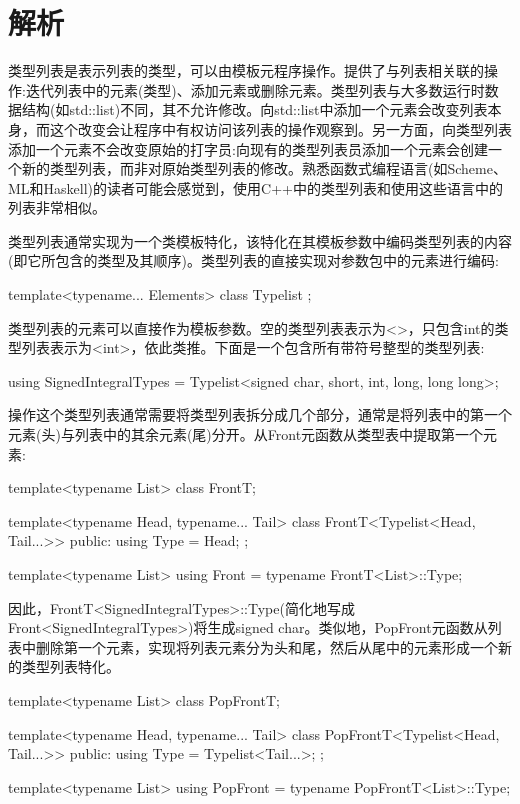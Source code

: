 \section{解析}
类型列表是表示列表的类型，可以由模板元程序操作。提供了与列表相关联的操作:迭代列表中的元素(类型)、添加元素或删除元素。类型列表与大多数运行时数据结构(如std::list)不同，其不允许修改。向std::list中添加一个元素会改变列表本身，而这个改变会让程序中有权访问该列表的操作观察到。另一方面，向类型列表添加一个元素不会改变原始的打字员:向现有的类型列表员添加一个元素会创建一个新的类型列表，而非对原始类型列表的修改。熟悉函数式编程语言(如Scheme、ML和Haskell)的读者可能会感觉到，使用C++中的类型列表和使用这些语言中的列表非常相似。

类型列表通常实现为一个类模板特化，该特化在其模板参数中编码类型列表的内容(即它所包含的类型及其顺序)。类型列表的直接实现对参数包中的元素进行编码:

\begin{cpp}
template<typename... Elements>
class Typelist
{
};
\end{cpp}

类型列表的元素可以直接作为模板参数。空的类型列表表示为<>，只包含int的类型列表表示为<int>，依此类推。下面是一个包含所有带符号整型的类型列表:

\begin{cpp}
using SignedIntegralTypes =
			Typelist<signed char, short, int, long, long long>;
\end{cpp}

操作这个类型列表通常需要将类型列表拆分成几个部分，通常是将列表中的第一个元素(头)与列表中的其余元素(尾)分开。从Front元函数从类型表中提取第一个元素:

\begin{cpp}
template<typename List>
class FrontT;

template<typename Head, typename... Tail>
class FrontT<Typelist<Head, Tail...>>
{
	public:
	using Type = Head;
};

template<typename List>
using Front = typename FrontT<List>::Type;
\end{cpp}

因此，FrontT<SignedIntegralTypes>::Type(简化地写成Front<SignedIntegralTypes>)将生成signed char。类似地，PopFront元函数从列表中删除第一个元素，实现将列表元素分为头和尾，然后从尾中的元素形成一个新的类型列表特化。

\begin{cpp}
template<typename List>
class PopFrontT;

template<typename Head, typename... Tail>
class PopFrontT<Typelist<Head, Tail...>> {
	public:
	using Type = Typelist<Tail...>;
};

template<typename List>
using PopFront = typename PopFrontT<List>::Type;
\end{cpp}

